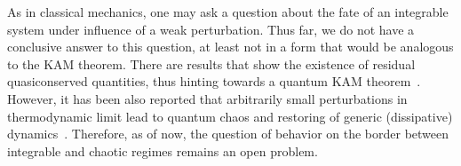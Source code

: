 As in classical mechanics, one may ask a question about the fate of an integrable system
under influence of a weak perturbation. Thus far, we do not have a conclusive answer to this
question, at least not in a form that would be analogous to the KAM theorem. There are results
that show the existence of residual quasiconserved quantities, thus hinting towards a
quantum KAM theorem~\autocite{Brandino2015}. However, it has been also reported that
arbitrarily small perturbations in thermodynamic limit lead to quantum chaos and restoring
of generic (dissipative) dynamics~\autocite{LeBlond2021}. Therefore, as of now, the question of behavior
on the border between integrable and chaotic regimes remains an open problem.
